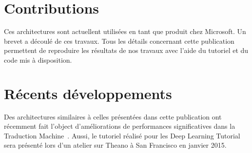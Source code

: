 \section{Contributions}

Ces architectures sont actuellent utilisées en tant que produit chez Microsoft.
Un brevet a découlé de ces travaux. Tous les détails concernant cette
publication permettent de reproduire les résultats de nos travaux avec l'aide
du tutoriel et du code mis à disposition. 

\section{R\'{e}cents d\'{e}veloppements}

Des architectures similaires à celles présentées dans cette publication ont
récemment fait l'object d'améliorations de performances significatives dans la
Traduction Machine~\citep{Seq-14}. Aussi, le tutoriel réalisé pour les Deep
Learning Tutorial sera présenté lors d'un atelier sur Theano à San Francisco en
janvier 2015.


